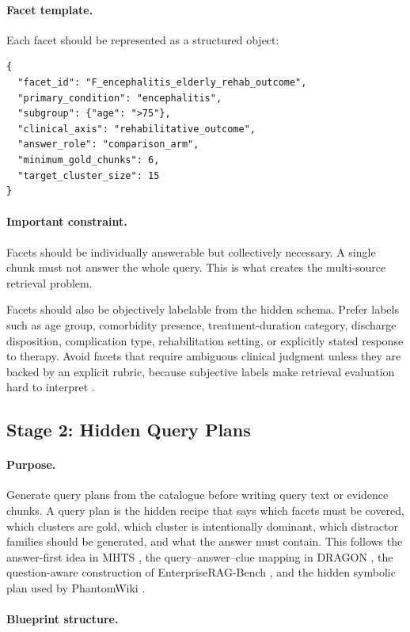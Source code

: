 \documentclass[11pt,a4paper]{article}
\newcommand{\stage}[2]{\subsection{\textcolor{betterblue}{#1}: #2}}
\begin{document}
\paragraph{Facet template.}
Each facet should be represented as a structured object:

\begin{lstlisting}[style=promptstyle]
{
  "facet_id": "F_encephalitis_elderly_rehab_outcome",
  "primary_condition": "encephalitis",
  "subgroup": {"age": ">75"},
  "clinical_axis": "rehabilitative_outcome",
  "answer_role": "comparison_arm",
  "minimum_gold_chunks": 6,
  "target_cluster_size": 15
}
\end{lstlisting}

\paragraph{Important constraint.}
Facets should be individually answerable but collectively necessary. A single chunk must not answer the whole query. This is what creates the multi-source retrieval problem.

Facets should also be objectively labelable from the hidden schema. Prefer labels such as age group, comorbidity presence, treatment-duration category, discharge disposition, complication type, rehabilitation setting, or explicitly stated response to therapy. Avoid facets that require ambiguous clinical judgment unless they are backed by an explicit rubric, because subjective labels make retrieval evaluation hard to interpret \citep{li2023synthetic}.

\stage{Stage 2}{Hidden Query Plans}

\paragraph{Purpose.}
Generate query plans from the catalogue before writing query text or evidence chunks. A query plan is the hidden recipe that says which facets must be covered, which clusters are gold, which cluster is intentionally dominant, which distractor families should be generated, and what the answer must contain. This follows the answer-first idea in MHTS \citep{lee2025mhts}, the query--answer--clue mapping in DRAGON \citep{shen2026dragon}, the question-aware construction of EnterpriseRAG-Bench \citep{sun2026enterpriseragbench}, and the hidden symbolic plan used by PhantomWiki \citep{gong2025phantomwiki}.

\paragraph{Blueprint structure.}
\end{document}
